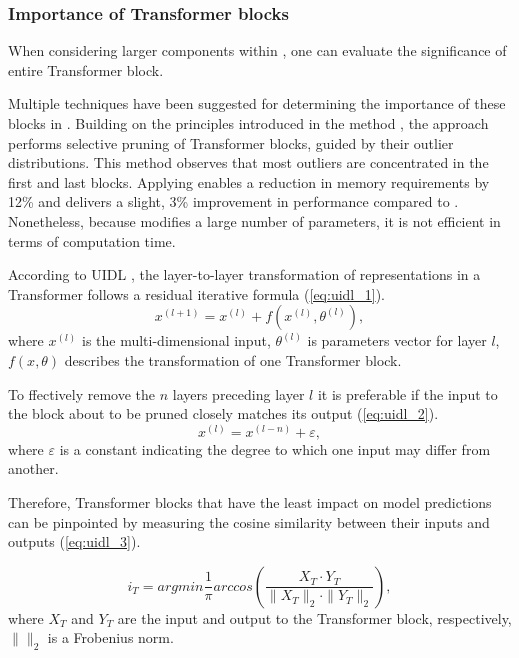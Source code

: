     \subsubsection{Importance of Transformer blocks}
        When considering larger components within \llm{}, one can evaluate the significance of entire Transformer block.

        Multiple techniques have been suggested for determining the importance of these blocks in \llms{}. Building on the principles introduced in the \wanda{} method \cite{wanda}, the \ows{} approach \cite{ows} performs selective pruning of Transformer blocks, guided by their outlier distributions. This method observes that most outliers are concentrated in the first and last blocks. Applying \ows{} enables a reduction in memory requirements by 12\% and delivers a slight, 3\% improvement in performance compared to \lora{}. Nonetheless, because \ows{} modifies a large number of parameters, it is not efficient in terms of computation time.

        According to UIDL \cite{uidl}, the layer-to-layer transformation of representations in a Transformer follows a residual iterative formula (\ref{eq:uidl_1}).
        \begin{equation}\label{eq:uidl_1}
            x^{(l + 1)} = x^{(l)} + f(x^{(l)}, \theta^{(l)}),
        \end{equation}
        where $x^{(l)}$ is the multi-dimensional input, $\theta^{(l)}$ is parameters vector for layer $l$, $f(x, \theta)$ describes the transformation of one Transformer block. 

        To ffectively remove the $n$ layers preceding layer  $l$ it is preferable if the input to the block about to be pruned closely matches its output (\ref{eq:uidl_2}). 
        \begin{equation}\label{eq:uidl_2}
            x^{(l)} = x^{(l - n)} + \varepsilon,
        \end{equation}
        where $\varepsilon$ is a constant indicating the degree to which one input may differ from another.

        Therefore, Transformer blocks that have the least impact on model predictions can be pinpointed by measuring the cosine similarity between their inputs and outputs (\ref{eq:uidl_3}).

        \begin{equation}\label{eq:uidl_3}
            i_T = argmin \frac{1}{\pi} arccos(\frac{X_T \cdot Y_T}{\|X_T\|_2 \cdot \|Y_T\|_2}),
        \end{equation}
        where $X_T$ and $Y_T$ are the input and output to the Transformer block, respectively, $\|\|_2$ is a Frobenius norm.

